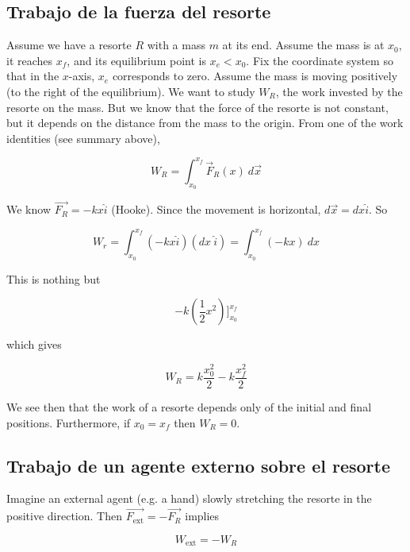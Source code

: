 \documentclass[12pt]{article}
\theoremstyle{definition}
\begin{document}
\subsection{Trabajo de la fuerza del resorte}

Assume we have a resorte $R$ with a mass $m$ at its end.  Assume the mass is at
$x_0$, it reaches $x_f$, and its equilibrium point is $x_e < x_0$. Fix the
coordinate system so that in the $x$-axis, $x_e$ corresponds to zero. Assume the
mass is moving positively (to the right of the equilibrium). We want to study
$W_R$, the work invested by the resorte on the mass. But we know that the force
of the resorte is not constant, but it depends on the distance from the mass to
the origin. From one of the work identities (see summary above),

\begin{equation*}
    W_R = \int_{x_0}^{x_f} \vec{F}_R(x) ~ d\vec{x}
\end{equation*}

We know $\vec{F_R} = -k x \hat{i}$ (Hooke). Since the movement is horizontal, 
$d \vec{x} = dx \hat{ i}$. So 

\begin{equation*}
    W_r = \int_{x_0}^{x_f}(- k x \hat{i}) (dx ~ \hat{i}) = \int_{x_0}^{x_f} (-k
    x) ~ dx
\end{equation*}

This is nothing but 

\begin{equation*}
-k \left( \frac{1}{2}x^2 \right)\Big]_{x_0}^{x_f}
\end{equation*}

which gives 

\begin{equation}
    W_R = k \frac{x_0^2}{2} - k \frac{x_f^2}{2}
\end{equation}

We see then that the work of a resorte depends only of the initial and final
positions. Furthermore, if $x_0 = x_f$ then $W_R = 0$.

\subsection{Trabajo de un agente externo sobre el resorte}

Imagine an external agent (e.g. a hand) slowly stretching the resorte in the
positive direction. Then $\vec{F_{\text{ext}}} = - \vec{F_R}$ implies 

\begin{equation*}
    W_{\text{ext}} = - W_R
\end{equation*}
\end{document}
